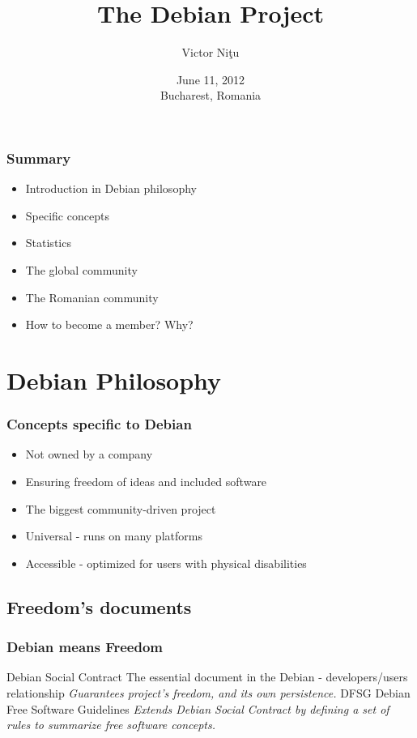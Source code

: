 \documentclass[xcolor=dvipsnames]{beamer}
\title[A universal project, with a global community]{The Debian Project}
\author{Victor Ni\c{t}u}
\institute[Ceata, Debian Romania]
{
Ceata Foundation\\Debian/RO Community\\
\medskip
{\emph{victor@debian-linux.ro}}
}
\date{June 11, 2012\\Bucharest, Romania}
\begin{document}
%
\begin{frame}
\titlepage
\end{frame}
%
\begin{frame}
\frametitle{Summary}
\begin{itemize}
\item Introduction in Debian philosophy
\item Specific concepts
\item Statistics
\item The global community
\item The Romanian community
\item How to become a member? Why?
\end{itemize}
\end{frame}
%
\section{Debian Philosophy}
\begin{frame}
\frametitle{Concepts specific to Debian}
\begin{block}{}
\begin{itemize}
\item Not owned by a company
\item Ensuring freedom of ideas and included software
\item The biggest community-driven project
\item Universal - runs on many platforms
\item Accessible - optimized for users with physical disabilities
\end{itemize}
\end{block}
\end{frame}

\subsection{Freedom's documents}
\begin{frame}
\frametitle{Debian means Freedom}
\footnotesize{
\begin{thebibliography}{99}
  Debian Social Contract
 \newblock The essential document in the Debian - developers/users relationship
 \newblock \emph{Guarantees project's freedom, and its own persistence.}
  DFSG
 \newblock Debian Free Software Guidelines
 \newblock \emph{Extends Debian Social Contract by defining a set of rules to summarize free software concepts.}
\end{thebibliography}
}
\end{frame}
%
\end{document}
